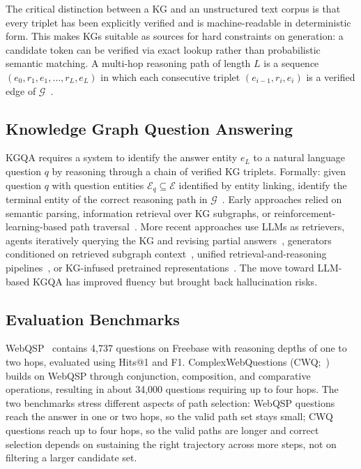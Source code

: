 The critical distinction between a KG and an unstructured text corpus is that every triplet has been explicitly verified and is machine-readable in deterministic form. This makes KGs suitable as sources for hard constraints on generation: a candidate token can be verified via exact lookup rather than probabilistic semantic matching. A multi-hop reasoning path of length $L$ is a sequence $(e_0, r_1, e_1, \ldots, r_L, e_L)$ in which each consecutive triplet $(e_{i-1}, r_i, e_i)$ is a verified edge of $\mathcal{G}$~\citep{lan2022survey}.

\subsection{Knowledge Graph Question Answering}

KGQA requires a system to identify the answer entity $e_L$ to a natural language question $q$ by reasoning through a chain of verified KG triplets. Formally: given question $q$ with question entities $\mathcal{E}_q \subseteq \mathcal{E}$ identified by entity linking, identify the terminal entity of the correct reasoning path in $\mathcal{G}$~\citep{lan2022survey}. Early approaches relied on semantic parsing, information retrieval over KG subgraphs, or reinforcement-learning-based path traversal~\citep{das2017go}. More recent approaches use LLMs as retrievers, agents iteratively querying the KG and revising partial answers~\citep{mavromatis2022rearev}, generators conditioned on retrieved subgraph context~\citep{jiang2023structgpt, jin2024graphcot, luo2024rog}, unified retrieval-and-reasoning pipelines~\citep{jiang2022unikgqa}, or KG-infused pretrained representations~\citep{wang2021kepler}. The move toward LLM-based KGQA has improved fluency but brought back hallucination risks.

\subsection{Evaluation Benchmarks}

WebQSP~\citep{yih2016websqp} contains 4,737 questions on Freebase with reasoning depths of one to two hops, evaluated using Hits@1 and F1. ComplexWebQuestions (CWQ;~\citealt{talmor2018cwq}) builds on WebQSP through conjunction, composition, and comparative operations, resulting in about 34,000 questions requiring up to four hops. The two benchmarks stress different aspects of path selection: WebQSP questions reach the answer in one or two hops, so the valid path set stays small; CWQ questions reach up to four hops, so the valid paths are longer and correct selection depends on sustaining the right trajectory across more steps, not on filtering a larger candidate set.

